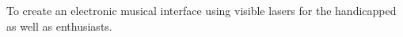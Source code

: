 To create an electronic musical interface using visible lasers for the handicapped as well as enthusiasts.
